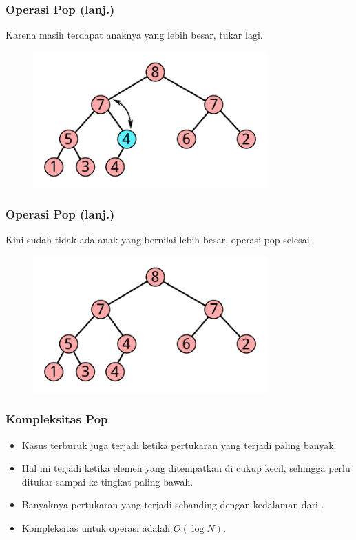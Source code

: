 \begin{frame}
\frametitle{Operasi Pop (lanj.)}
Karena masih terdapat anaknya yang lebih besar, tukar lagi.
\begin{figure}
  \includegraphics[width=9cm]{asset/pop-5.pdf}
\end{figure}
\end{frame}

\begin{frame}
\frametitle{Operasi Pop (lanj.)}
Kini sudah tidak ada anak yang bernilai lebih besar, operasi pop selesai.
\begin{figure}
  \includegraphics[width=9cm]{asset/pop-6.pdf}
\end{figure}
\end{frame}

\begin{frame}
\frametitle{Kompleksitas Pop}
\begin{itemize}
  \item Kasus terburuk juga terjadi ketika pertukaran yang terjadi paling banyak.
  \item Hal ini terjadi ketika elemen yang ditempatkan di  cukup kecil, sehingga perlu ditukar sampai ke tingkat paling bawah.
  \item Banyaknya pertukaran yang terjadi sebanding dengan kedalaman dari .
  \item Kompleksitas untuk operasi  adalah $O(\log{N})$.
\end{itemize}
\end{frame}

